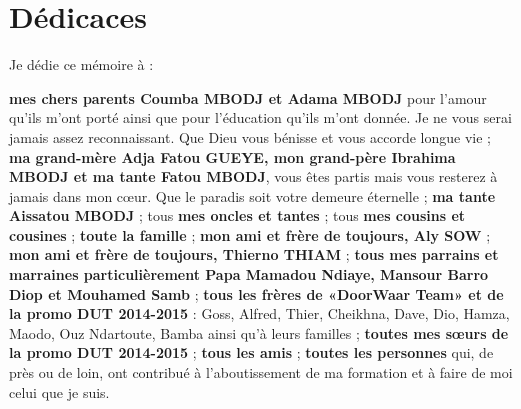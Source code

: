 %
%

\chapter*{Dédicaces}

Je dédie ce mémoire à : \\
\begin{itemize}
	\itemcheck \textbf{mes chers parents Coumba MBODJ et Adama MBODJ} pour l’amour qu’ils m’ont porté ainsi que pour l’éducation qu’ils m’ont donnée. Je ne vous serai jamais assez reconnaissant. Que Dieu vous bénisse et vous accorde longue vie ;
	\itemcheck  \textbf{ma grand-mère Adja Fatou GUEYE, mon grand-père Ibrahima MBODJ et ma tante Fatou MBODJ}, vous êtes partis mais vous resterez à jamais dans mon cœur. Que le paradis soit votre demeure éternelle ;
	\itemcheck \textbf{ma tante Aissatou MBODJ} ;
	\itemcheck tous \textbf{mes oncles et tantes} ;
	\itemcheck tous \textbf{mes cousins et cousines} ;
	\itemcheck \textbf{toute la famille} ;
	\itemcheck \textbf{mon ami et frère de toujours, Aly SOW} ;
	\itemcheck \textbf{mon ami et frère de toujours, Thierno THIAM} ;
	\itemcheck \textbf{tous mes parrains et marraines particulièrement Papa Mamadou Ndiaye, Mansour Barro Diop et Mouhamed Samb} ;
	\itemcheck \textbf{tous les frères de «DoorWaar Team» et de la promo DUT 2014-2015} : Goss, Alfred, Thier, Cheikhna, Dave, Dio, Hamza, Maodo, Ouz Ndartoute, Bamba ainsi qu'à leurs familles ;
	\itemcheck \textbf{toutes mes sœurs de la promo DUT 2014-2015} ;
	\itemcheck \textbf{tous les amis} ;
	\itemcheck \textbf{toutes les personnes} qui, de près ou de loin, ont contribué à l’aboutissement de ma formation et à faire de moi celui que je suis.
\end{itemize}
\clearpage